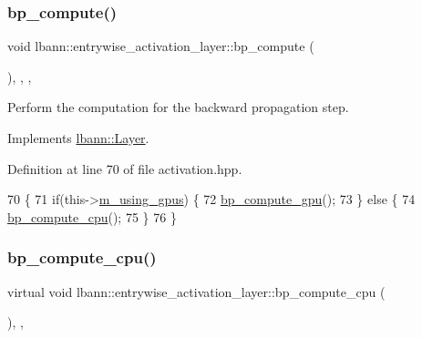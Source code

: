 \subsubsection{\texorpdfstring{bp\+\_\+compute()}{bp\_compute()}}
{\footnotesize\ttfamily void lbann\+::entrywise\+\_\+activation\+\_\+layer\+::bp\+\_\+compute (\begin{DoxyParamCaption}{ }\end{DoxyParamCaption})\hspace{0.3cm}{\ttfamily [inline]}, {\ttfamily [override]}, {\ttfamily [protected]}, {\ttfamily [virtual]}}

Perform the computation for the backward propagation step. 

Implements \hyperlink{classlbann_1_1Layer_a7442e01f9ee1294df2de811efcf5171e}{lbann\+::\+Layer}.



Definition at line 70 of file activation.\+hpp.


\begin{DoxyCode}
70                              \{
71     \textcolor{keywordflow}{if}(this->\hyperlink{classlbann_1_1Layer_af7881cb5eff5207c15fa835d65462e8f}{m\_using\_gpus}) \{
72       \hyperlink{classlbann_1_1entrywise__activation__layer_a569674cb4c0f50ea76acc0733fc53ba9}{bp\_compute\_gpu}();
73     \} \textcolor{keywordflow}{else} \{
74       \hyperlink{classlbann_1_1entrywise__activation__layer_a38c2c090f26fb8ca269bef45989564a5}{bp\_compute\_cpu}();
75     \}
76   \}
\end{DoxyCode}
\mbox{\label{classlbann_1_1entrywise__activation__layer_a38c2c090f26fb8ca269bef45989564a5}} 
\subsubsection{\texorpdfstring{bp\+\_\+compute\+\_\+cpu()}{bp\_compute\_cpu()}}
{\footnotesize\ttfamily virtual void lbann\+::entrywise\+\_\+activation\+\_\+layer\+::bp\+\_\+compute\+\_\+cpu (\begin{DoxyParamCaption}{ }\end{DoxyParamCaption})\hspace{0.3cm}{\ttfamily [inline]}, {\ttfamily [protected]}, {\ttfamily [virtual]}}




